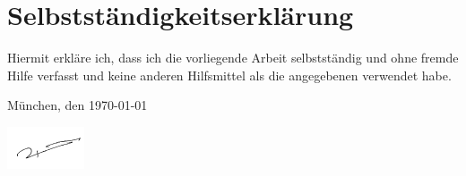 \section*{Selbstständigkeitserklärung}

\begin{flushleft}
Hiermit erkläre ich, dass ich die vorliegende Arbeit selbstständig und ohne fremde Hilfe verfasst und keine anderen Hilfsmittel als die angegebenen verwendet habe.

\vspace{2em}

München, den \today

\vspace{2em}

\includegraphics[width=0.17\textwidth]{logos/signature.png}
\end{flushleft}